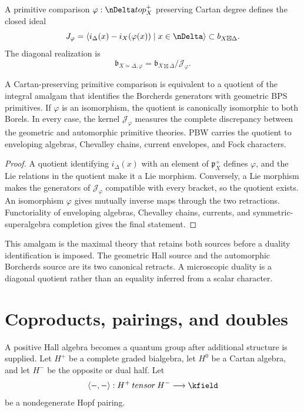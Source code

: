 \begin{definition}
A primitive comparison $\varphi:\nDelta\to\mathfrak p_X^+$ preserving Cartan degree defines the closed ideal
\[
 \mathcal J_\varphi
 =\overline{\angles{
   i_\Delta(x)-i_X(\varphi(x))\mid x\in\nDelta
 }}
 \subset\mathfrak b_{X\boxtimes\Delta}.
\]
The diagonal realization is
\[
 \mathfrak b_{X\simeq\Delta,\varphi}
 =\mathfrak b_{X\boxtimes\Delta}/\mathcal J_\varphi.
\]
\end{definition}

\begin{theorem}
A Cartan-preserving primitive comparison is equivalent to a quotient of the integral amalgam that identifies the Borcherds generators with geometric BPS primitives.  If $\varphi$ is an isomorphism, the quotient is canonically isomorphic to both Borels.  In every case, the kernel $\mathcal J_\varphi$ measures the complete discrepancy between the geometric and automorphic primitive theories.  PBW carries the quotient to enveloping algebras, Chevalley chains, current envelopes, and Fock characters.
\end{theorem}
\begin{proof}
A quotient identifying $i_\Delta(x)$ with an element of $\mathfrak p_X^+$ defines $\varphi$, and the Lie relations in the quotient make it a Lie morphism.  Conversely, a Lie morphism makes the generators of $\mathcal J_\varphi$ compatible with every bracket, so the quotient exists.  An isomorphism $\varphi$ gives mutually inverse maps through the two retractions.  Functoriality of enveloping algebras, Chevalley chains, currents, and symmetric-superalgebra completion gives the final statement.
\end{proof}

This amalgam is the maximal theory that retains both sources before a duality identification is imposed.  The geometric Hall source and the automorphic Borcherds source are its two canonical retracts.  A microscopic duality is a diagonal quotient rather than an equality inferred from a scalar character.

\chapter{Coproducts, pairings, and doubles}
A positive Hall algebra becomes a quantum group after additional structure is supplied. Let $H^+$ be a complete graded bialgebra, let $H^0$ be a Cartan algebra, and let $H^-$ be the opposite or dual half. Let
\[
 \angles{-,-}:H^+\widehattensor H^-\longrightarrow\kfield
\]
be a nondegenerate Hopf pairing.

